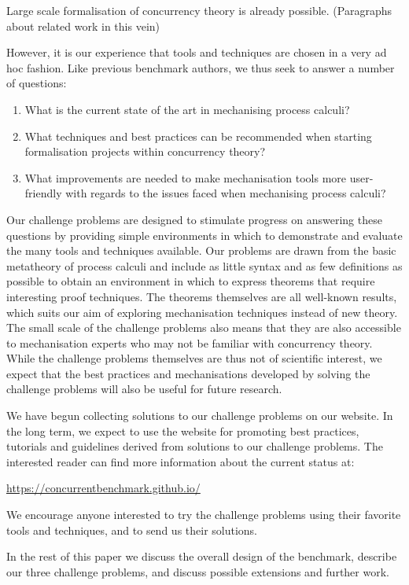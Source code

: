 \documentclass[runningheads]{llncs}
\begin{document}
Large scale formalisation of concurrency theory is already possible.
(Paragraphs about related work in this vein)

However, it is our experience that tools and techniques are chosen in a very ad hoc fashion.
Like previous benchmark authors, we thus seek to answer a number of questions:
\begin{enumerate}
\item What is the current state of the art in mechanising process calculi?
\item What techniques and best practices can be recommended when starting formalisation projects within concurrency theory?
\item What improvements are needed to make mechanisation tools more user-friendly with regards to the issues faced when mechanising process calculi?
\end{enumerate}

Our challenge problems are designed to stimulate progress on answering these questions by providing simple environments in which to demonstrate and evaluate the many tools and techniques available.
Our problems are drawn from the basic metatheory of process calculi and include as little syntax and as few definitions as possible to obtain an environment in which to express theorems that require interesting proof techniques.
The theorems themselves are all well-known results, which suits our aim of exploring mechanisation techniques instead of new theory.
The small scale of the challenge problems also means that they are also accessible to mechanisation experts who may not be familiar with concurrency theory.
While the challenge problems themselves are thus not of scientific interest, we expect that the best practices and mechanisations developed by solving the challenge problems will also be useful for future research.

We have begun collecting solutions to our challenge problems on our website.
In the long term, we expect to use the website for promoting best practices, tutorials and guidelines derived from solutions to our challenge problems.
The interested reader can find more information about the current status at:
\begin{center}
  \url{https://concurrentbenchmark.github.io/}
\end{center}
We encourage anyone interested to try the challenge problems using their favorite tools and techniques, and to send us their solutions.

In the rest of this paper we discuss the overall design of the benchmark, describe our three challenge problems, and discuss possible extensions and further work.
\end{document}
